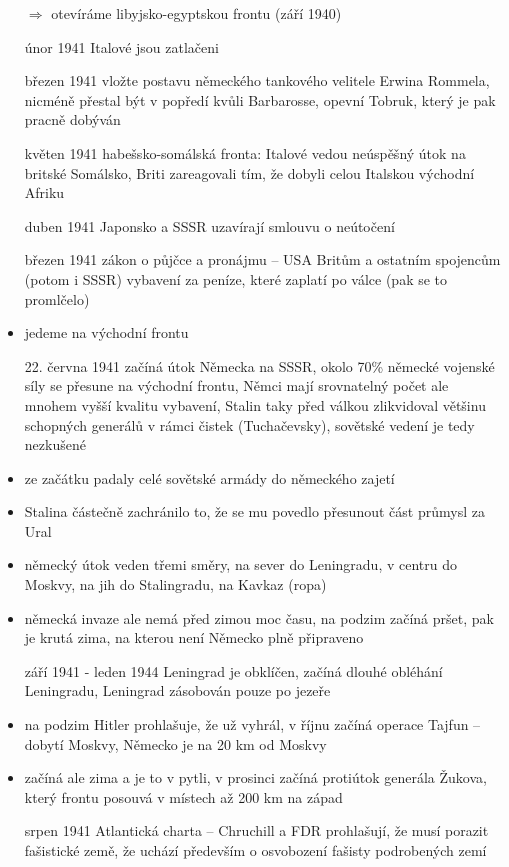 \documentclass{article}
\begin{document}
\begin{itemize}
    \item[$\Rightarrow$] otevíráme libyjsko-egyptskou frontu (září 1940)
    \item[únor 1941] Italové jsou zatlačeni
    \item[březen 1941] vložte postavu německého tankového velitele Erwina Rommela, nicméně přestal být v popředí kvůli Barbarosse, opevní Tobruk, který je pak pracně dobýván
    \item[květen 1941] habešsko-somálská fronta: Italové vedou neúspěšný útok na britské Somálsko, Briti zareagovali tím, že dobyli celou Italskou východní Afriku
    \item[duben 1941] Japonsko a SSSR uzavírají smlouvu o neútočení
    \item[březen 1941] zákon o půjčce a pronájmu -- USA  Britům a ostatním spojencům (potom i SSSR) vybavení za peníze, které zaplatí po válce (pak se to promlčelo)
    \item jedeme na východní frontu
    \item[22. června 1941] začíná útok Německa na SSSR, okolo 70\% německé vojenské síly se přesune na východní frontu, Němci mají srovnatelný počet ale mnohem vyšší kvalitu vybavení, Stalin taky před válkou zlikvidoval většinu schopných generálů v rámci čistek (Tuchačevsky), sovětské vedení je tedy nezkušené
    \item ze začátku padaly celé sovětské armády do německého zajetí
    \item Stalina částečně zachránilo to, že se mu povedlo přesunout část průmysl za Ural
    \item německý útok veden třemi směry, na sever do Leningradu, v centru do Moskvy, na jih do Stalingradu, na Kavkaz (ropa)
    \item německá invaze ale nemá před zimou moc času, na podzim začíná pršet, pak je krutá zima, na kterou není Německo plně připraveno
    \item[září 1941 - leden 1944] Leningrad je obklíčen, začíná dlouhé obléhání Leningradu, Leningrad zásobován pouze po jezeře
    \item na podzim Hitler prohlašuje, že už vyhrál, v říjnu začíná operace Tajfun -- dobytí Moskvy, Německo je na 20 km od Moskvy
    \item začíná ale zima a je to v pytli, v prosinci začíná protiútok generála Žukova, který frontu posouvá v místech až 200 km na západ
    \item[srpen 1941] Atlantická charta -- Chruchill a FDR prohlašují, že musí porazit fašistické země, že uchází především o osvobození fašisty podrobených zemí

\end{itemize}
\end{document}
